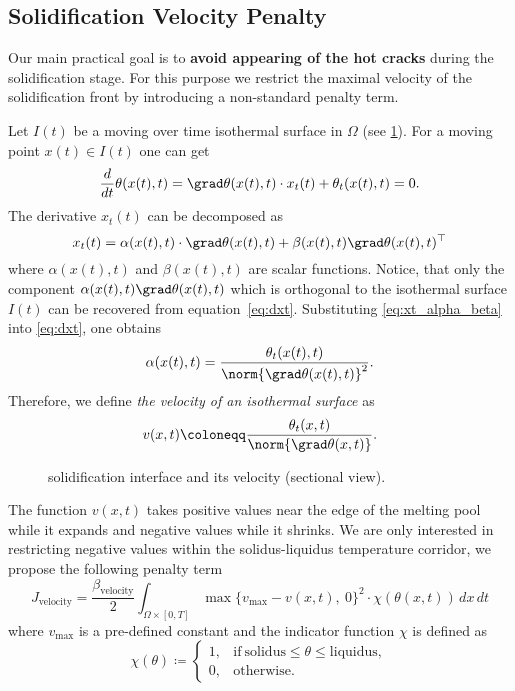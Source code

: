 \subsection{Solidification Velocity Penalty}
\label{subsec:velocity}

Our main practical goal is to \textbf{avoid appearing of the hot cracks} during the solidification stage. For this purpose we restrict the maximal velocity of the solidification front by introducing a non-standard penalty term.

Let $I(t)$ be a moving over time isothermal surface in $\Omega$ (see \cref{fig:velocity}). For a moving point $x(t) \in I(t)$ one can get
\begin{equation} \label{eq:dxt}
	\frac{d}{dt} \theta(x(t),t) = \grad \theta(x(t),t) \cdot x_t(t) + \theta_t(x(t),t) = 0.
\end{equation}
The derivative $x_t(t)$ can be decomposed as
\begin{equation} \label{eq:xt_alpha_beta}
	x_t(t) = \alpha(x(t),t) \cdot \grad \theta(x(t),t) + \beta(x(t),t) \grad \theta(x(t),t)^{\top}
\end{equation}
where $\alpha(x(t),t)$ and $\beta(x(t),t)$ are scalar functions. Notice, that only the component $\alpha(x(t),t) \grad \theta(x(t),t)$ which is orthogonal to the isothermal surface $I(t)$ can be recovered from equation~\eqref{eq:dxt}. Substituting \eqref{eq:xt_alpha_beta} into \eqref{eq:dxt}, one obtains
\begin{equation}
	\alpha(x(t),t) = \frac{\theta_t(x(t),t)}{\norm{\grad \theta(x(t),t)}^2}.
\end{equation}
Therefore, we define \emph{the velocity of an isothermal surface} as
\begin{equation}
	v(x,t) \coloneqq \frac{\theta_t(x,t)}{\norm{\grad \theta(x,t)}}.
\end{equation}


\begin{figure}
	\centering
	
	\caption{ solidification interface and its velocity (sectional view).}
	\label{fig:velocity}
\end{figure}

The function $v(x,t)$ takes positive values near the edge of the melting pool while it expands and negative values while it shrinks. We are only interested in restricting negative values within the solidus-liquidus temperature corridor, we propose the following penalty term
\begin{equation}
	J_{\text{velocity}} = \frac{\beta_\text{velocity}}{2}
	\int_{\Omega \times [0,T]} \max \{ v_{\max} - v(x,t),\ 0 \}^2 \cdot \chi(\theta(x,t))\, dx\,dt
\end{equation}where $v_{\max}$ is a pre-defined constant and the indicator function $\chi$ is defined as
\begin{equation}
	\chi(\theta) \coloneqq \left\{
		\begin{array}{ll}
			1, & \text{if}\ \text{solidus} \le \theta \le \text{liquidus}, \\
			0, & \text{otherwise}.
		\end{array} \right.
\end{equation}



